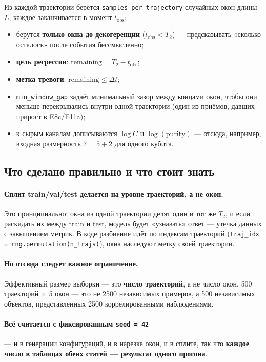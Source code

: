 \documentclass[12pt,a4paper]{article}
\newcommand{\code}[1]{\texttt{#1}}
\begin{document}
Из каждой траектории берётся \code{samples\_per\_trajectory} случайных окон
длины $L$, каждое заканчивается в момент $t_{\mathrm{obs}}$:

\begin{itemize}
  \item берутся \textbf{только окна до декогеренции}
        ($t_{\mathrm{obs}}<T_2$) — предсказывать «сколько осталось» после
        события бессмысленно;
  \item \textbf{цель регрессии}: $\text{remaining}=T_2-t_{\mathrm{obs}}$;
  \item \textbf{метка тревоги}: $\text{remaining}\leq\Delta t$;
  \item \code{min\_window\_gap} задаёт минимальный зазор между концами окон,
        чтобы они меньше перекрывались внутри одной траектории (один из
        приёмов, давших прирост в E8c/E11a);
  \item к сырым каналам дописываются $\log C$ и $\log(\text{purity})$ — отсюда,
        например, входная размерность $7=5+2$ для одного кубита.
\end{itemize}

\subsection{Что сделано правильно и что стоит знать}

\paragraph{Сплит train/val/test делается на уровне траекторий, а не окон.}
Это принципиально: окна из одной траектории делят один и тот же $T_2$, и если
раскидать их между train и test, модель будет «узнавать» ответ — утечка данных
с завышением метрик. В коде разбиение идёт по индексам траекторий
(\code{traj\_idx = rng.permutation(n\_trajs)}), окна наследуют метку своей
траектории.

\paragraph{Но отсюда следует важное ограничение.} Эффективный размер выборки —
это \textbf{число траекторий}, а не число окон. 500 траекторий $\times$ 5 окон —
это не 2500 независимых примеров, а 500 независимых объектов, представленных
2500 коррелированными наблюдениями.

\paragraph{Всё считается с фиксированным \code{seed = 42}} — и в генерации
конфигураций, и в нарезке окон, и в сплите, так что \textbf{каждое число в
таблицах обеих статей — результат одного прогона}.
\end{document}
